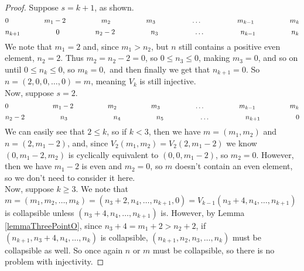 \documentclass{amsart}
\begin{document}
\begin{proof}
	Suppose $s=k+1$, as shown.
	$$0 \hspace{.7in} m_1-2 \hspace{.7in} m_2 \hspace{.7in} m_3 \hspace{.7in} \ldots \hspace{.7in} m_{k-1} \hspace{.7in} m_k$$
	$$n_{k+1} \hspace{.7in} 0 \hspace{.7in} n_2-2 \hspace{.7in} n_3 \hspace{.7in} \ldots \hspace{.7in} n_{k-1} \hspace{.7in} n_k$$
	We note that $m_1=2$ and, since $m_1 > n_2$, but $n$ still contains a positive even element, $n_2=2$. Thus $m_2=n_2-2=0$, so $0 \leq n_3 \leq 0$, making $m_3=0$, and so on until $0 \leq n_k \leq 0$, so $m_k=0,$ and then finally we get that $n_{k+1}=0$. So $n=(2,0,0,\ldots,0)=m$, meaning $V_k$ is still injective. \\
	Now, suppose $s=2$. 
	$$0 \hspace{.9in} m_1-2 \hspace{.7in} m_2 \hspace{.7in} m_3 \hspace{.7in} \ldots \hspace{.7in} m_{k-1} \hspace{.7in} m_k$$
	$$n_2-2 \hspace{.7in} n_3 \hspace{.9in} n_4 \hspace{.7in} n_5 \hspace{.7in} \ldots \hspace{.7in} n_{k+1} \hspace{.7in} 0$$
	We can easily see that $2 \leq k$, so if $k < 3$, then we have $m=(m_1,m_2)$ and $n=(2,m_1-2)$, and, since $V_2(m_1,m_2)=V_2(2,m_1-2)$ we know $(0,m_1-2,m_2)$ is cyclically equivalent to $(0,0,m_1-2)$, so $m_2=0$. However, then we have $m_1-2$ is even and $m_2=0$, so $m$ doesn't contain an even element, so we don't need to consider it here. \\
	Now, suppose $k \geq 3$. We note that $m=(m_1,m_2,\ldots,m_k)=(n_3+2,n_4,\ldots,n_{k+1},0)=V_{k-1}(n_3+4,n_4,\ldots,n_{k+1})$ is collapsible unless $(n_3+4,n_4,\ldots,n_{k+1})$ is. However, by Lemma \ref{lemmaThreePointO}, since $n_3+4=m_1+2>n_2+2$, if $(n_{k+1},n_3+4,n_4,\ldots,n_k)$ is collapsible, $(n_{k+1},n_2,n_3,\ldots,n_k)$ must be collapsible as well. So once again $n$ or $m$ must be collapsible, so there is no problem with injectivity. \end{proof}
\end{document}
